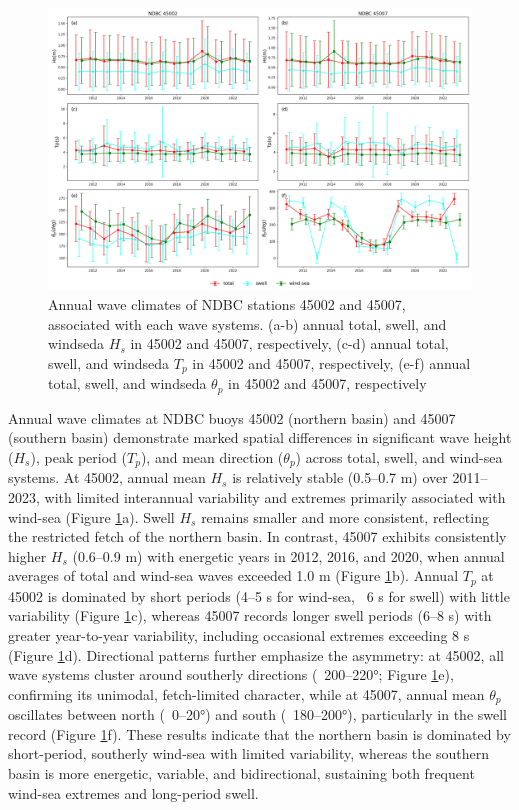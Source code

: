 \begin{figure}[htbp]
  \centering
  \includegraphics[width=1\textwidth]{chapter4/resources/ndbc_annual.png}
  \caption{Annual wave climates of NDBC stations 45002 and 45007, associated
  with each wave systems. (a-b) annual total, swell, and windseda $H_s$ in 45002
  and 45007, respectively, (c-d) annual total, swell, and windseda $T_p$ in
  45002 and 45007, respectively, (e-f) annual total, swell, and windseda
  $\theta_p$ in 45002 and 45007, respectively }
  \label{fig:ndbc_annual}
\end{figure}

Annual wave climates at NDBC buoys 45002 (northern basin) and 45007 (southern
basin) demonstrate marked spatial differences in significant wave height
($H_s$), peak period ($T_p$), and mean direction ($\theta_p$) across total,
swell, and wind-sea systems. At 45002, annual mean $H_s$ is relatively stable
(0.5–0.7 m) over 2011–2023, with limited interannual variability and extremes
primarily associated with wind-sea (Figure \ref{fig:ndbc_annual}a). Swell $H_s$
remains smaller and more consistent, reflecting the restricted fetch of the
northern basin. In contrast, 45007 exhibits consistently higher $H_s$ (0.6–0.9
m) with energetic years in 2012, 2016, and 2020, when annual averages of total
and wind-sea waves exceeded 1.0 m (Figure \ref{fig:ndbc_annual}b). Annual $T_p$
at 45002 is dominated by short periods (4–5 s for wind-sea, ~6 s for swell) with
little variability (Figure \ref{fig:ndbc_annual}c), whereas 45007 records longer
swell periods (6–8 s) with greater year-to-year variability, including
occasional extremes exceeding 8 s (Figure \ref{fig:ndbc_annual}d). Directional
patterns further emphasize the asymmetry: at 45002, all wave systems cluster
around southerly directions (~200–220°; Figure \ref{fig:ndbc_annual}e),
confirming its unimodal, fetch-limited character, while at 45007, annual mean
$\theta_p$ oscillates between north (~0–20°) and south (~180–200°), particularly
in the swell record (Figure \ref{fig:ndbc_annual}f). These results indicate that
the northern basin is dominated by short-period, southerly wind-sea with limited
variability, whereas the southern basin is more energetic, variable, and
bidirectional, sustaining both frequent wind-sea extremes and long-period swell.

